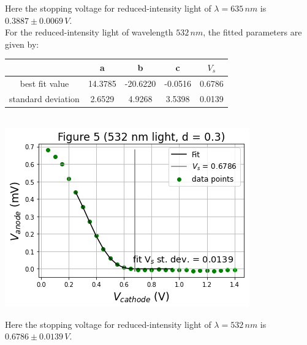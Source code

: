 \documentclass[11pt]{book}
\theoremstyle{break}
\theoremstyle{break}
\begin{document}
Here the stopping voltage for reduced-intensity light of $\lambda = 635\, nm$ is $0.3887\pm 0.0069\, V$. \\

For the reduced-intensity light of wavelength $532\, nm$, the fitted parameters are given by:
\begin{center}
\hfill\break
\begin{tabular}{|c|c|c|c|c|}
\hline
 & a & b & c & $V_s$\\
\hline
best fit value & 14.3785 & -20.6220 & -0.0516 & 0.6786\\
\hline
standard deviation & 2.6529 & 4.9268 & 3.5398 & 0.0139 \\
\hline
\end{tabular}\\
\hfill\break
\hfill\break
\includegraphics[scale=0.5]{fig5.png}
\end{center}
Here the stopping voltage for reduced-intensity light of $\lambda = 532\, nm$ is $0.6786\pm 0.0139\, V$. \\
\end{document}
